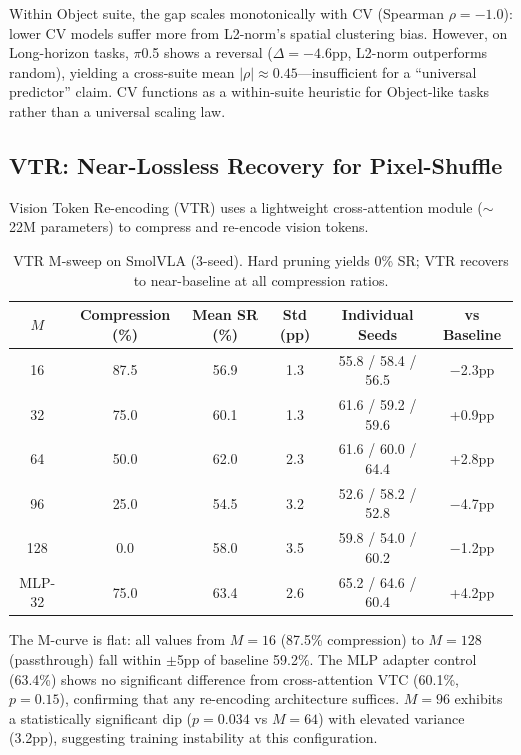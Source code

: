 \documentclass[letterpaper]{article}
\begin{document}
Within Object suite, the gap scales monotonically with CV (Spearman $\rho=-1.0$): lower CV models suffer more from L2-norm's spatial clustering bias.
However, on Long-horizon tasks, $\pi$0.5 shows a reversal ($\Delta=-4.6$pp, L2-norm outperforms random), yielding a cross-suite mean $|\rho| \approx 0.45$---insufficient for a ``universal predictor'' claim.
CV functions as a within-suite heuristic for Object-like tasks rather than a universal scaling law.

\subsection{VTR: Near-Lossless Recovery for Pixel-Shuffle}

Vision Token Re-encoding (VTR) uses a lightweight cross-attention module ($\sim$22M parameters) to compress and re-encode vision tokens.

\begin{table}[h]
\centering
\caption{VTR M-sweep on SmolVLA (3-seed). Hard pruning yields 0\% SR; VTR recovers to near-baseline at all compression ratios.}
\label{tab:vtr_msweep}
\begin{tabular}{cccccc}
\toprule
$M$ & Compression (\%) & Mean SR (\%) & Std (pp) & Individual Seeds & vs Baseline \\
\midrule
16 & 87.5 & 56.9 & 1.3 & 55.8 / 58.4 / 56.5 & $-$2.3pp \\
32 & 75.0 & 60.1 & 1.3 & 61.6 / 59.2 / 59.6 & +0.9pp \\
64 & 50.0 & 62.0 & 2.3 & 61.6 / 60.0 / 64.4 & +2.8pp \\
96 & 25.0 & 54.5 & 3.2 & 52.6 / 58.2 / 52.8 & $-$4.7pp \\
128 & 0.0 & 58.0 & 3.5 & 59.8 / 54.0 / 60.2 & $-$1.2pp \\
MLP-32 & 75.0 & 63.4 & 2.6 & 65.2 / 64.6 / 60.4 & +4.2pp \\
\bottomrule
\end{tabular}
\end{table}

The M-curve is flat: all values from $M=16$ (87.5\% compression) to $M=128$ (passthrough) fall within $\pm$5pp of baseline 59.2\%.
The MLP adapter control (63.4\%) shows no significant difference from cross-attention VTC (60.1\%, $p=0.15$), confirming that any re-encoding architecture suffices.
$M=96$ exhibits a statistically significant dip ($p=0.034$ vs $M=64$) with elevated variance (3.2pp), suggesting training instability at this configuration.
\end{document}
